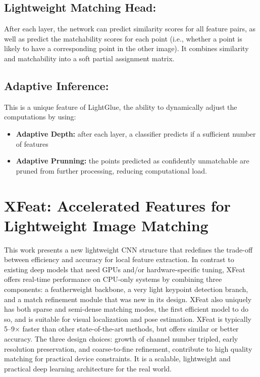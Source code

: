 \subsection{Lightweight Matching Head:}
After each layer, the network can predict similarity scores for all feature
pairs, as well as predict the matchability scores for each point (i.e., whether
a point is likely to have a corresponding point in the other image). It
combines similarity and matchability into a soft partial assignment matrix.
\subsection{Adaptive Inference:}
This is a unique feature of LightGlue, the ability to dynamically adjust the
computations by using:
\begin{itemize}
    \item \textbf{Adaptive Depth: }after each layer, a classifier predicts if a sufficient number of features
    \item \textbf{Adaptive Prunning:} the points predicted as confidently unmatchable are pruned from further processing, reducing computational load.
\end{itemize}
\section{XFeat: Accelerated Features for Lightweight Image Matching}
This work presents a new lightweight CNN structure that redefines the trade-off
between efficiency and accuracy for local feature extraction. In contrast to
existing deep models that need GPUs and/or hardware-specific tuning, XFeat
offers real-time performance on CPU-only systems by combining three components:
a featherweight backbone, a very light keypoint detection branch, and a match
refinement module that was new in its design. XFeat also uniquely has both
sparse and semi-dense matching modes, the first efficient model to do so, and
is suitable for visual localization and pose estimation. XFeat is typically
5–9× faster than other state-of-the-art methods, but offers similar or better
accuracy. The three design choices: growth of channel number tripled, early
resolution preservation, and coarse-to-fine refinement, contribute to high
quality matching for practical device constraints. It is a scalable,
lightweight and practical deep learning architecture for the real world.
